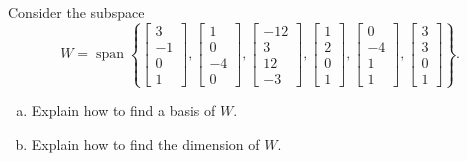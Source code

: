 
\begin{exerciseStatement}


Consider the subspace \[W=\operatorname{span}  \left\{ \left[\begin{array}{c}
3 \\
-1 \\
0 \\
1
\end{array}\right] , \left[\begin{array}{c}
1 \\
0 \\
-4 \\
0
\end{array}\right] , \left[\begin{array}{c}
-12 \\
3 \\
12 \\
-3
\end{array}\right] , \left[\begin{array}{c}
1 \\
2 \\
0 \\
1
\end{array}\right] , \left[\begin{array}{c}
0 \\
-4 \\
1 \\
1
\end{array}\right] , \left[\begin{array}{c}
3 \\
3 \\
0 \\
1
\end{array}\right] \right\} .\]


\begin{enumerate}[(a)]
\item  Explain how to find a basis of \(W\).
\item  Explain how to find the dimension of \(W\).
\end{enumerate}
    
\end{exerciseStatement}
    
